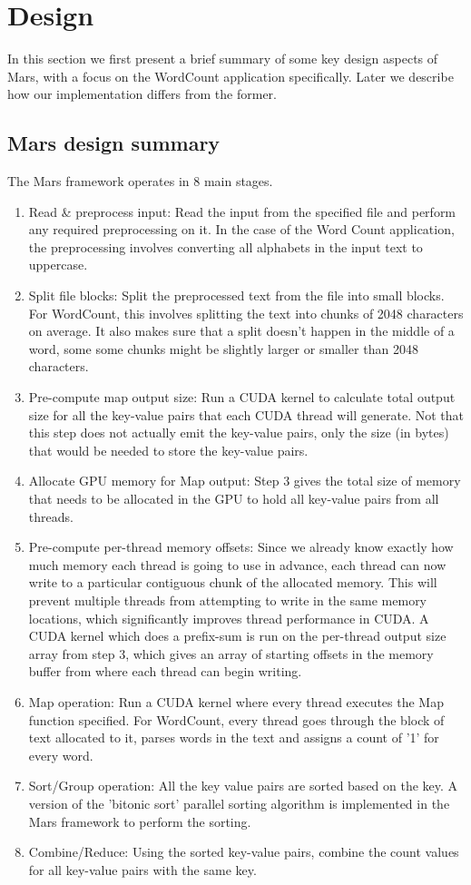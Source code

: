 \documentclass{article}
\begin{document}
\section{Design}
In this section we first present a brief summary of some key design aspects of Mars, with a focus on the WordCount application specifically. Later we describe how our implementation differs from the former.

\subsection{Mars design summary} \label{mars-design-summary}
The Mars framework operates in 8 main stages. 
\begin{enumerate}
    \item Read \& preprocess input: Read the input from the specified file and perform any required preprocessing on it. In the case of the Word Count application, the preprocessing involves converting all alphabets in the input text to uppercase. 
    \item Split file blocks: Split the preprocessed text from the file into small blocks. For WordCount, this involves splitting the text into chunks of 2048 characters on average. It also makes sure that a split doesn't happen in the middle of a word, some some chunks might be slightly larger or smaller than 2048 characters.
    \item Pre-compute map output size: Run a CUDA kernel to calculate total output size for all the key-value pairs that each CUDA thread will generate. Not that this step does not actually emit the key-value pairs, only the size (in bytes) that would be needed to store the key-value pairs. 
    \item Allocate GPU memory for Map output: Step 3 gives the total size of memory that needs to be allocated in the GPU to hold all key-value pairs from all threads. 
    \item Pre-compute per-thread memory offsets: Since we already know exactly how much memory each thread is going to use in advance, each thread can now write to a particular contiguous chunk of the allocated memory. This will prevent multiple threads from attempting to write in the same memory locations, which significantly improves thread performance in CUDA. A CUDA kernel which does a prefix-sum is run on the per-thread output size array from step 3, which gives an array of starting offsets in the memory buffer from where each thread can begin writing. 
    \item Map operation: Run a CUDA kernel where every thread executes the Map function specified. For WordCount, every thread goes through the block of text allocated to it, parses words in the text and assigns a count of '1' for every word.
    \item Sort/Group operation: All the key value pairs are sorted based on the key. A version of the 'bitonic sort' parallel sorting algorithm is implemented in the Mars framework to perform the sorting.
    \item Combine/Reduce: Using the sorted key-value pairs, combine the count values for all key-value pairs with the same key.
\end{enumerate}
\end{document}
